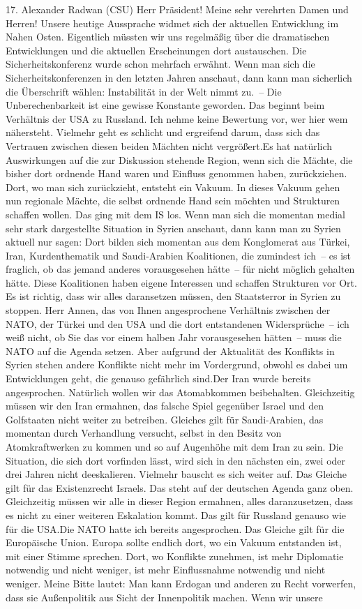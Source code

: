 \documentclass{article}
\begin{document}
	17. Alexander Radwan (CSU) Herr Präsident! Meine sehr verehrten Damen und Herren! Unsere heutige Aussprache widmet sich der aktuellen Entwicklung im Nahen Osten. Eigentlich müssten wir uns regelmäßig über die dramatischen Entwicklungen und die aktuellen Erscheinungen dort austauschen. Die Sicherheitskonferenz wurde schon mehrfach erwähnt. Wenn man sich die Sicherheitskonferenzen in den letzten Jahren anschaut, dann kann man sicherlich die Überschrift wählen: Instabilität in der Welt nimmt zu. – Die Unberechenbarkeit ist eine gewisse Konstante geworden. Das beginnt beim Verhältnis der USA zu Russland. Ich nehme keine Bewertung vor, wer hier wem nähersteht. Vielmehr geht es schlicht und ergreifend darum, dass sich das Vertrauen zwischen diesen beiden Mächten nicht vergrößert.Es hat natürlich Auswirkungen auf die zur Diskussion stehende Region, wenn sich die Mächte, die bisher dort ordnende Hand waren und Einfluss genommen haben, zurückziehen. Dort, wo man sich zurückzieht, entsteht ein Vakuum. In dieses Vakuum gehen nun regionale Mächte, die selbst ordnende Hand sein möchten und Strukturen schaffen wollen. Das ging mit dem IS los. Wenn man sich die momentan medial sehr stark dargestellte Situation in Syrien anschaut, dann kann man zu Syrien aktuell nur sagen: Dort bilden sich momentan aus dem Konglomerat aus Türkei, Iran, Kurdenthematik und Saudi-Arabien Koalitionen, die zumindest ich – es ist fraglich, ob das jemand anderes vorausgesehen hätte – für nicht möglich gehalten hätte. Diese Koalitionen haben eigene Interessen und schaffen Strukturen vor Ort. Es ist richtig, dass wir alles daransetzen müssen, den Staatsterror in Syrien zu stoppen. Herr Annen, das von Ihnen angesprochene Verhältnis zwischen der NATO, der Türkei und den USA und die dort entstandenen Widersprüche – ich weiß nicht, ob Sie das vor einem halben Jahr vorausgesehen hätten – muss die NATO auf die Agenda setzen. Aber aufgrund der Aktualität des Konflikts in Syrien stehen andere Konflikte nicht mehr im Vordergrund, obwohl es dabei um Entwicklungen geht, die genauso gefährlich sind.Der Iran wurde bereits angesprochen. Natürlich wollen wir das Atomabkommen beibehalten. Gleichzeitig müssen wir den Iran ermahnen, das falsche Spiel gegenüber Israel und den Golfstaaten nicht weiter zu betreiben. Gleiches gilt für Saudi-Arabien, das momentan durch Verhandlung versucht, selbst in den Besitz von Atomkraftwerken zu kommen und so auf Augenhöhe mit dem Iran zu sein. Die Situation, die sich dort vorfinden lässt, wird sich in den nächsten ein, zwei oder drei Jahren nicht deeskalieren. Vielmehr bauscht es sich weiter auf. Das Gleiche gilt für das Existenzrecht Israels. Das steht auf der deutschen Agenda ganz oben. Gleichzeitig müssen wir alle in dieser Region ermahnen, alles daranzusetzen, dass es nicht zu einer weiteren Eskalation kommt. Das gilt für Russland genauso wie für die USA.Die NATO hatte ich bereits angesprochen. Das Gleiche gilt für die Europäische Union. Europa sollte endlich dort, wo ein Vakuum entstanden ist, mit einer Stimme sprechen. Dort, wo Konflikte zunehmen, ist mehr Diplomatie notwendig und nicht weniger, ist mehr Einflussnahme notwendig und nicht weniger. Meine Bitte lautet: Man kann Erdogan und anderen zu Recht vorwerfen, dass sie Außenpolitik aus Sicht der Innenpolitik machen. Wenn wir unsere 
\end{document}
